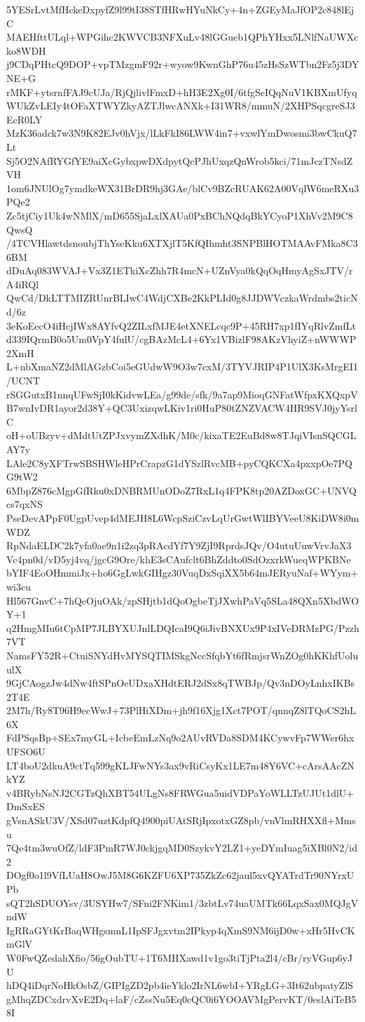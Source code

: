 5YESrLvtMfHckeDxpyfZ9l99tI38STfHRwHYuNkCy+4n+ZGEyMaJfOP2c848lEjC
MAEHfttULql+WPGihc2KWVCB3NFXuLv48lGGueb1QPhYHxx5LNlfNaUWXcko8WDH
j9CDqPHtcQ9DOP+vpTMzgmF92r+wyow9KwnGhP76u45zHsSzWTbn2Fz5j3DYNE+G
rMKF+ytsrnfFAJ9cUJa/RjQjlivlFmxD+hH3E2Xg0I/6tfgScIQqNuV1KBXmUfyq
WUkZvLEIy4tOFaXTWYZkyAZTJlwcANXk+I31WR8/mmuN/2XHPSqcgreSJ3EcR0LY
MzK36adck7w3N9K82EJv0hVjx/lLkFkI86LWW4in7+vxwlYmDwosmi3bwCkuQ7Lt
Sj5O2NAfRYGfYE9aiXcGybxpwDXdpytQcPJhUxqzQnWrob5kci/71mJczTNsdZVH
1om6JNUlOg7ymdkeWX31BrDR9hj3GAe/blCv9BZcRUAK62A00VqlW6meRXu3PQe2
Zc5tjCiy1Uk4wNMlX/mD655SjaLxlXAUa0PxBChNQdqBkYCyoP1XhVv2M9C8QwsQ
/4TCVHlawtdsnoubjThYseKku6XTXjlT5KfQIhmht3SNPBlHOTMAAvFMka8C36BM
dDuAq083WVAJ+Vx3Z1ETkiXcZhh7R4mcN+UZnVya0kQqOqHmyAgSxJTV/rA4iRQl
QwCd/DkLTTMIZRUnrBLIwC4WdjCXBe2KkPLId0g8JJDWVczkaWrdmbs2ticNd/6z
3eKoEecO4iHcjIWx8AYfvQ2ZILxfMJE4etXNELcqc9P+45RH7xp1fIYqRlvZmfLt
d339IQrmB0o5Um0VpY4fulU/cgBAzMcL4+6Yx1VBizlF98AKzVhyiZ+nWWWP2XmH
L+nbXmaNZ2dMlAGzbCoi5eGUdwW9O3w7cxM/3TYVJRIP4P1UlX3KsMrgEI1/UCNT
rSGGutxB1nnqUFwSjI0kKidvwLEa/g99de/sfk/9a7ap9MioqGNFatWfpxKXQxpV
B7wnIvDR1ayor2d38Y+QC3UxizqwLKiv1ri0HuP80tZNZVACW4HR9SVJ0jyYsrlC
oH+oUBzyv+dMdtUtZPJxvymZXdhK/M0c/kixaTE2EuBd8w8TJqiVIsnSQCGLAY7y
LAle2C8yXFTrwSBSHWleHPrCrapzG1dYSzlRvcMB+pyCQKCXa4pxxpOe7PQG9tW2
6MbpZ876cMgpGfRku0xDNBRMUnODoZ7RxL1q4FPK8tp20AZDoxGC+UNVQcs7qxNS
PseDevAPpF0UgpUvep4dMEJH8L6WcpSziCzvLqUrGwtWlIBYVeeU8KiDW8i0mWDZ
RpNdaELDC2k7yfa0ae9n1i2zq3pRAcdYf7Y9ZjI9RprdsJQv/O4utuUuwVrvJaX3
Vc4pn0d/vD5yj4vq/jgcG9Ore/khE3sCAufclt6BhZddto0SdOzxrkWueqWPKBNe
bYIF4EoOHmmiJx+ho6GgLwkGIHgz30VuqDxSqiXX5b64mJERyuNaf+WYym+wi3cu
Hl567GnvC+7hQeOjuOAk/zpSHjtb1dQoOgbeTjJXwhPaVq5SLa48QXn5XbdWOY+1
q2HmgMIu6tCpMP7JLBYXUJnlLDQIcaI9Q6iJivBNXUx9P4xIVeDRMzPG/Pzzh7VT
NamsFY52R+CtuiSNYdHvMYSQTIMSkgNccSfqbYt6fRmjsrWnZOg0hKKhfUoluulX
9GjCAogzJw4dNw4ftSPnOeUDxaXHdtERJ2dSx8qTWBJp/Qv3nDOyLnhxIKBs2T4E
2M7h/Ry8T96H9ecWwJ+73PlHiXDm+jh9f16Xjg1Xct7POT/qnnqZ8lTQoCS2hL6X
FdPSqsBp+SEx7myGL+IcbeEmLzNq9o2AUvRVDa8SDM4KCywvFp7WWer6hxUFSO6U
LT4boU2dkuA9ctTq599gKLJFwNYs3ax9vRiCsyKx1LE7m48Y6VC+cArsAAcZNkYZ
v4BRybNsNJ2CGTzQhXBT54ULgNs8FRWGua5uidVDPaYoWLLTzUJUt1dlU+DmSxES
gVsnASkU3V/XSd07uztKdpfQ4900piUAtSRjIpxotxGZ8pb/vnVlmRHXXfl+Mmsu
7Qe4tm3wuOfZ/ldF3PmR7WJ0ckjgqMD0SzykvY2LZ1+yeDYmIuag5iXBl0N2/id2
DOgf0o1l9VfLUaH8OwJ5M8G6KZFU6XP735ZkZc62jaul5xvQYATrdTr90NYrxUPb
sQT2hSDUOYsv/3USYHw7/SFni2FNKim1/3zbtLv74uaUMTk66LqxSax0MQJgVndW
IgRRaGYtKrBaqWHgsmnL1IpSFJgxvtm2IPkyp4qXmS9NM6ijD0w+xHr5HvCKmGlV
W0FwQZedahXfio/56gOubTU+1T6MHXawd1v1go3tiTjPta2l4/cBr/ryVGup6yJU
hDQ4iDqrNoHkOsbZ/GIPIgZD2pb4ieYklo2IrNL6wbI+YRgLG+3It62ubpatyZlS
gMhqZDCxdrvXvE2Dq+laF/cZssNu5Eq0cQC0i6YOOAVMgPervKT/0eslAiTeB58I
